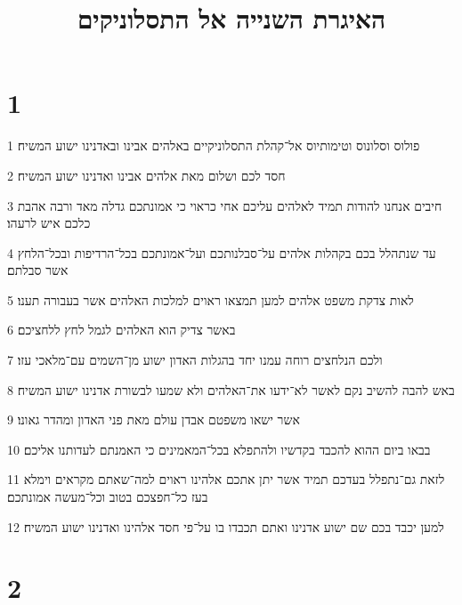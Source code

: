 

\title{האיגרת השנייה אל התסלוניקים}


\chapter{1}

\par 1 פולוס וסלונוס וטימותיוס אל־קהלת התסלוניקיים באלהים אבינו ובאדנינו ישוע המשיח׃
\par 2 חסד לכם ושלום מאת אלהים אבינו ואדנינו ישוע המשיח׃
\par 3 חיבים אנחנו להודות תמיד לאלהים עליכם אחי כראוי כי אמונתכם גדלה מאד ורבה אהבת כלכם איש לרעהו׃
\par 4 עד שנתהלל בכם בקהלות אלהים על־סבלנותכם ועל־אמונתכם בכל־הרדיפות ובכל־הלחץ אשר סבלתם׃
\par 5 לאות צדקת משפט אלהים למען תמצאו ראוים למלכות האלהים אשר בעבורה תענו׃
\par 6 באשר צדיק הוא האלהים לגמל לחץ ללחציכם׃
\par 7 ולכם הנלחצים רוחה עמנו יחד בהגלות האדון ישוע מן־השמים עם־מלאכי עזו׃
\par 8 באש להבה להשיב נקם לאשר לא־ידעו את־האלהים ולא שמעו לבשורת אדנינו ישוע המשיח׃
\par 9 אשר ישאו משפטם אבדן עולם מאת פני האדון ומהדר גאונו׃
\par 10 בבאו ביום ההוא להכבד בקדשיו ולהתפלא בכל־המאמינים כי האמנתם לעדותנו אליכם׃
\par 11 לזאת גם־נתפלל בעדכם תמיד אשר יתן אתכם אלהינו ראוים למה־שאתם מקראים וימלא בעז כל־חפצכם בטוב וכל־מעשה אמונתכם׃
\par 12 למען יכבד בכם שם ישוע אדנינו ואתם תכבדו בו על־פי חסד אלהינו ואדנינו ישוע המשיח׃

\chapter{2}

